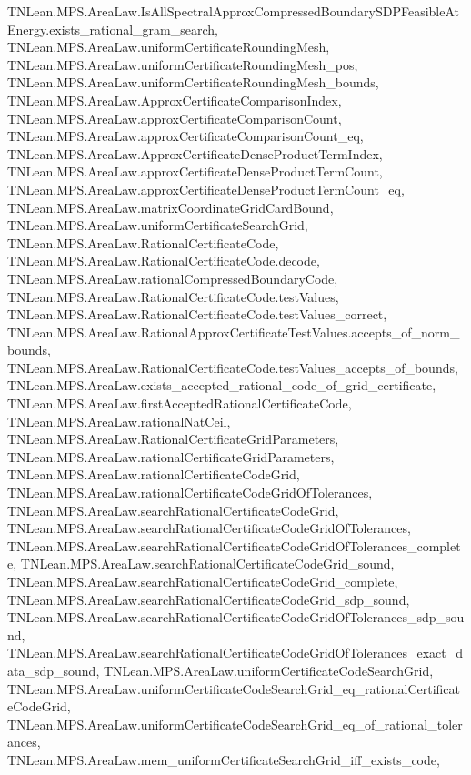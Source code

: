 \begin{lemma}
{        TNLean.MPS.AreaLaw.IsAllSpectralApproxCompressedBoundarySDPFeasibleAtEnergy.exists_rational_gram_search,
        TNLean.MPS.AreaLaw.uniformCertificateRoundingMesh,
        TNLean.MPS.AreaLaw.uniformCertificateRoundingMesh_pos,
        TNLean.MPS.AreaLaw.uniformCertificateRoundingMesh_bounds,
        TNLean.MPS.AreaLaw.ApproxCertificateComparisonIndex,
        TNLean.MPS.AreaLaw.approxCertificateComparisonCount,
        TNLean.MPS.AreaLaw.approxCertificateComparisonCount_eq,
        TNLean.MPS.AreaLaw.ApproxCertificateDenseProductTermIndex,
        TNLean.MPS.AreaLaw.approxCertificateDenseProductTermCount,
        TNLean.MPS.AreaLaw.approxCertificateDenseProductTermCount_eq,
        TNLean.MPS.AreaLaw.matrixCoordinateGridCardBound,
        TNLean.MPS.AreaLaw.uniformCertificateSearchGrid,
        TNLean.MPS.AreaLaw.RationalCertificateCode,
        TNLean.MPS.AreaLaw.RationalCertificateCode.decode,
        TNLean.MPS.AreaLaw.rationalCompressedBoundaryCode,
        TNLean.MPS.AreaLaw.RationalCertificateCode.testValues,
        TNLean.MPS.AreaLaw.RationalCertificateCode.testValues_correct,
        TNLean.MPS.AreaLaw.RationalApproxCertificateTestValues.accepts_of_norm_bounds,
        TNLean.MPS.AreaLaw.RationalCertificateCode.testValues_accepts_of_bounds,
        TNLean.MPS.AreaLaw.exists_accepted_rational_code_of_grid_certificate,
        TNLean.MPS.AreaLaw.firstAcceptedRationalCertificateCode,
        TNLean.MPS.AreaLaw.rationalNatCeil,
        TNLean.MPS.AreaLaw.RationalCertificateGridParameters,
        TNLean.MPS.AreaLaw.rationalCertificateGridParameters,
        TNLean.MPS.AreaLaw.rationalCertificateCodeGrid,
        TNLean.MPS.AreaLaw.rationalCertificateCodeGridOfTolerances,
        TNLean.MPS.AreaLaw.searchRationalCertificateCodeGrid,
        TNLean.MPS.AreaLaw.searchRationalCertificateCodeGridOfTolerances,
        TNLean.MPS.AreaLaw.searchRationalCertificateCodeGridOfTolerances_complete,
        TNLean.MPS.AreaLaw.searchRationalCertificateCodeGrid_sound,
        TNLean.MPS.AreaLaw.searchRationalCertificateCodeGrid_complete,
        TNLean.MPS.AreaLaw.searchRationalCertificateCodeGrid_sdp_sound,
        TNLean.MPS.AreaLaw.searchRationalCertificateCodeGridOfTolerances_sdp_sound,
        TNLean.MPS.AreaLaw.searchRationalCertificateCodeGridOfTolerances_exact_data_sdp_sound,
        TNLean.MPS.AreaLaw.uniformCertificateCodeSearchGrid,
        TNLean.MPS.AreaLaw.uniformCertificateCodeSearchGrid_eq_rationalCertificateCodeGrid,
        TNLean.MPS.AreaLaw.uniformCertificateCodeSearchGrid_eq_of_rational_tolerances,
        TNLean.MPS.AreaLaw.mem_uniformCertificateSearchGrid_iff_exists_code,
}
\end{lemma}
